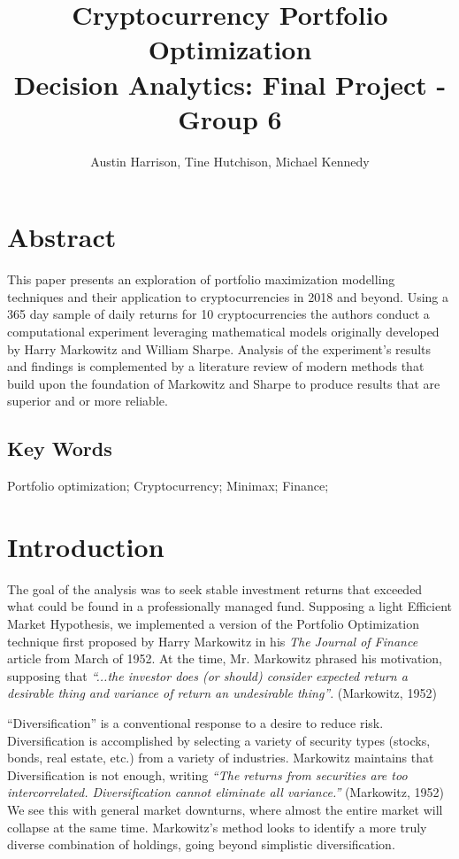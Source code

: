 \documentclass[11pt]{article} %
\title{Cryptocurrency Portfolio Optimization\\
\large Decision Analytics:  Final Project - Group 6}
\author{Austin Harrison, Tine Hutchison, Michael Kennedy}
\begin{document}
\maketitle


\section{Abstract}

This paper presents an exploration of portfolio maximization modelling techniques and their application to cryptocurrencies in 2018 and beyond.  Using a 365 day sample of daily returns for 10 cryptocurrencies the authors conduct a computational experiment leveraging mathematical models originally developed by Harry Markowitz and William Sharpe.  Analysis of the experiment’s results and findings is complemented by a literature review of modern methods that build upon the foundation of Markowitz and Sharpe to produce results that are superior and or more reliable.

\subsection{Key Words}

Portfolio optimization; Cryptocurrency; Minimax; Finance;

\section{Introduction}

The goal of the analysis was to seek stable investment returns that exceeded what could be found in a professionally managed fund. Supposing a light Efficient Market Hypothesis, we implemented a version of the Portfolio Optimization technique first proposed by Harry Markowitz in his\emph{ The Journal of Finance} article from March of 1952. At the time, Mr. Markowitz phrased his motivation, supposing that\emph{ ``...the investor does (or should) consider expected return a desirable thing and variance of return an undesirable thing”}. (Markowitz, 1952)

``Diversification” is a conventional response to a desire to reduce risk. Diversification is accomplished by selecting a variety of security types (stocks, bonds, real estate, etc.) from a variety of industries. Markowitz maintains that Diversification is not enough, writing \emph{``The returns from securities are too intercorrelated. Diversification cannot eliminate all variance.”} (Markowitz, 1952) We see this with general market downturns, where almost the entire market will collapse at the same time. Markowitz’s method looks to identify a more truly diverse combination of holdings, going beyond simplistic diversification.
\end{document}
